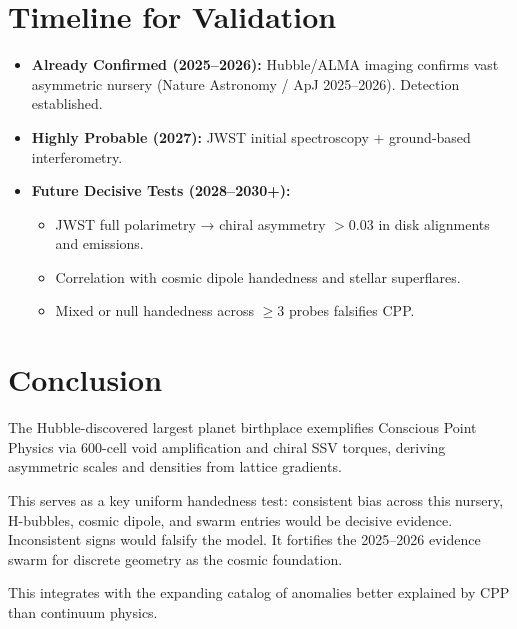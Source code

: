 \documentclass[11pt]{article}
\begin{document}
\section{Timeline for Validation}
\begin{itemize}
    \item \textbf{Already Confirmed (2025--2026):} Hubble/ALMA imaging confirms vast asymmetric nursery (Nature Astronomy / ApJ 2025--2026). Detection established.
    \item \textbf{Highly Probable (2027):} JWST initial spectroscopy + ground-based interferometry.
    \item \textbf{Future Decisive Tests (2028--2030+):}
    \begin{itemize}
        \item JWST full polarimetry → chiral asymmetry $>0.03$ in disk alignments and emissions.
        \item Correlation with cosmic dipole handedness and stellar superflares.
        \item Mixed or null handedness across $\geq 3$ probes falsifies CPP.
    \end{itemize}
\end{itemize}

\section{Conclusion}
The Hubble-discovered largest planet birthplace exemplifies Conscious Point Physics via 600-cell void amplification and chiral SSV torques, deriving asymmetric scales and densities from lattice gradients.  

This serves as a key uniform handedness test: consistent bias across this nursery, H-bubbles, cosmic dipole, and swarm entries would be decisive evidence. Inconsistent signs would falsify the model. It fortifies the 2025--2026 evidence swarm for discrete geometry as the cosmic foundation.  

This integrates with the expanding catalog of anomalies better explained by CPP than continuum physics.
\end{document}
